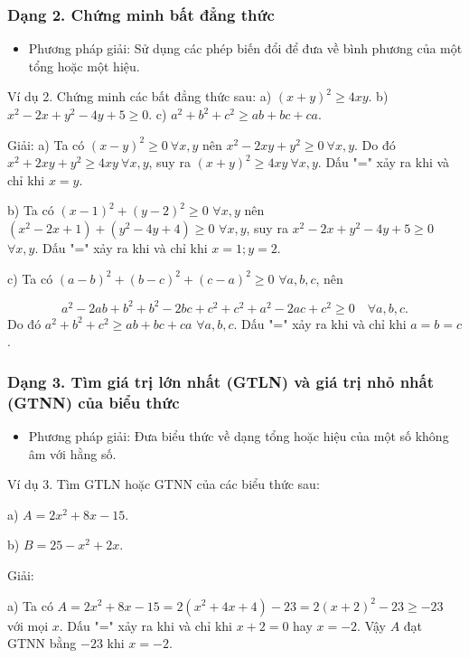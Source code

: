 \documentclass[%
    fontsize=12pt,%
    chapterprefix=false,%
    open=right,%
    twoside=false,%
    numbers=noenddot,%
    headings=optiontohead,%
    final,%
    DIV=15,%
    parskip=half %
]{scrbook}
\begin{document}
\subsubsection{Dạng 2. Chứng minh bất đẳng thức}

\begin{itemize}
  \item Phương pháp giải: Sử dụng các phép biến đổi để đưa về bình phương của một tổng hoặc một hiệu.
\end{itemize}

Ví dụ 2. Chứng minh các bất đẳng thức sau: a) $ (x + y)^2 \geq 4xy $. b) $ x^2 - 2x + y^2 - 4y + 5 \geq 0 $. c) $ a^2 + b^2 + c^2 \geq ab + bc + ca $.

Giải: a) Ta có $ (x - y)^2 \geq 0 \ \forall x, y $ nên $ x^2 - 2xy + y^2 \geq 0 \ \forall x, y $. Do đó $ x^2 + 2xy + y^2 \geq 4xy \ \forall x, y $, suy ra $ (x + y)^2 \geq 4xy \ \forall x, y $. Dấu "=" xảy ra khi và chỉ khi $ x = y $.


b) Ta có $(x - 1)^2 + (y - 2)^2 \geq 0$ $ \forall x, y $ nên $\left(x^2 - 2x + 1\right) + \left(y^2 - 4y + 4\right) \geq 0$ $ \forall x, y $, suy ra $x^2 - 2x + y^2 - 4y + 5 \geq 0$ $ \forall x, y $. Dấu "=" xảy ra khi và chỉ khi $x = 1; y = 2$.

c) Ta có $(a - b)^2 + (b - c)^2 + (c - a)^2 \geq 0$ $ \forall a, b, c $, nên

\[
a^2 - 2ab + b^2 + b^2 - 2bc + c^2 + c^2 + a^2 - 2ac + c^2 \geq 0 \quad \forall a, b, c .
\]
Do đó $a^2 + b^2 + c^2 \geq ab + bc + ca$ $ \forall a, b, c $. Dấu "=" xảy ra khi và chỉ khi $a = b = c$.
\subsubsection{Dạng 3. Tìm giá trị lớn nhất (GTLN) và giá trị nhỏ nhất (GTNN) của biểu thức}

\begin{itemize}
  \item Phương pháp giải: Đưa biểu thức về dạng tổng hoặc hiệu của một số không âm với hằng số.
\end{itemize}

Ví dụ 3. Tìm GTLN hoặc GTNN của các biểu thức sau:

a) $A = 2x^2 + 8x - 15$.

b) $B = 25 - x^2 + 2x$.

Giải:

a) Ta có $A = 2x^2 + 8x - 15 = 2(x^2 + 4x + 4) - 23 = 2(x + 2)^2 - 23 \geq -23$ với mọi $x$. Dấu "=" xảy ra khi và chỉ khi $x + 2 = 0$ hay $x = -2$. Vậy $A$ đạt GTNN bằng $-23$ khi $x = -2$.
\end{document}
